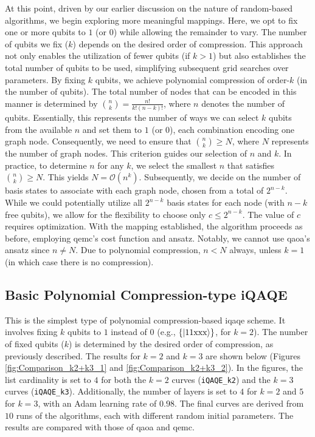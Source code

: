 At this point, driven by our earlier discussion on the nature of random-based algorithms, we begin exploring more meaningful mappings. Here, we opt to fix one or more qubits to $1$ (or $0$) while allowing the remainder to vary. The number of qubits we fix ($k$) depends on the desired order of compression. This approach not only enables the utilization of fewer qubits (if $k > 1$) but also establishes the total number of qubits to be used, simplifying subsequent grid searches over parameters. By fixing $k$ qubits, we achieve polynomial compression of order-$k$ (in the number of qubits). The total number of nodes that can be encoded in this manner is determined by $\binom{n}{k} = \frac{n!}{k!(n - k)!}$, where $n$ denotes the number of qubits. Essentially, this represents the number of ways we can select $k$ qubits from the available $n$ and set them to $1$ (or $0$), each combination encoding one graph node. Consequently, we need to ensure that $\binom{n}{k} \geq N$, where $N$ represents the number of graph nodes. This criterion guides our selection of $n$ and $k$. In practice, to determine $n$ for any $k$, we select the smallest $n$ that satisfies $\binom{n}{k} \geq N$. This yields $N = \mathcal{O}(n^k)$. Subsequently, we decide on the number of basis states to associate with each graph node, chosen from a total of $2^{n-k}$. While we could potentially utilize all $2^{n-k}$ basis states for each node (with $n-k$ free qubits), we allow for the flexibility to choose only $c \leq 2^{n-k}$. The value of $c$ requires optimization. With the mapping established, the algorithm proceeds as before, employing \acrshort{qemc}'s cost function and ansatz. Notably, we cannot use \acrshort{qaoa}'s ansatz since $n \neq N$. Due to polynomial compression, $n < N$ always, unless $k = 1$ (in which case there is no compression).






\subsection{Basic Polynomial Compression-type iQAQE}
\label{subsection:Basic_Poly-Comp_iQAQE}


This is the simplest type of polynomial compression-based \acrshort{iqaqe} scheme. It involves fixing $k$ qubits to $1$ instead of $0$ (e.g., $\{\ket{11\text{xxx}}\}$, for $k = 2$). The number of fixed qubits ($k$) is determined by the desired order of compression, as previously described. The results for $k = 2$ and $k = 3$ are shown below (Figures \ref{fig:Comparison_k2+k3_1} and \ref{fig:Comparison_k2+k3_2}). In the figures, the list cardinality is set to $4$ for both the $k = 2$ curves (\texttt{iQAQE\_k2}) and the $k = 3$ curves (\texttt{iQAQE\_k3}). Additionally, the number of layers is set to $4$ for $k = 2$ and $5$ for $k = 3$, with an Adam learning rate of $0.98$. The final curves are derived from $10$ runs of the algorithms, each with different random initial parameters. The results are compared with those of \acrshort{qaoa} and \acrshort{qemc}.

